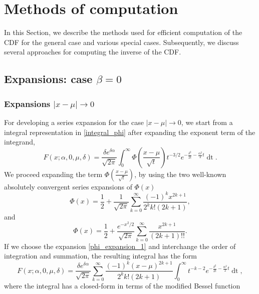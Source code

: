 \documentclass[10pt,a4paper,oneside]{article}
\numberwithin{equation}{section}
\begin{document}
\section{Methods of computation}
In this Section, we describe the methods used for efficient computation of the CDF for the general case and various special cases. Subsequently, we discuss several approaches for computing the inverse of the CDF.
\subsection{Expansions: case $\beta = 0$}

\subsubsection{Expansions $|x-\mu| \to 0$}
For developing a series expansion for the case $|x-\mu| \to 0$, we start from a integral representation in \eqref{integral_phi} after expanding the exponent term of the integrand,
\begin{equation}\label{integral_phi2}
F(x; \alpha, 0, \mu, \delta) = \frac{\delta e^{\delta \alpha}}{\sqrt{2\pi}} \int_0^{\infty} \Phi\left(\frac{x - \mu}{\sqrt{t}}\right) t^{-3/2} e^{-\frac{\delta^2}{2t} - \frac{\alpha^2}{2}t} \mathop{dt}.
\end{equation}
We proceed expanding the term $\Phi\left(\frac{x-\mu}{\sqrt{t}}\right)$, by using the two well-known absolutely convergent series expansions of $\Phi(x)$ \cite[\S 2]{Lebedev1972}
\begin{equation}\label{phi_expansion_1}
\Phi(x) = \frac{1}{2} + \frac{1}{\sqrt{2\pi}}\sum_{k=0}^{\infty} \frac{(-1)^k x^{2k + 1}}{2^k k! (2k+1)},
\end{equation}
and
\begin{equation}\label{phi_expansion_2}
\Phi(x) = \frac{1}{2} + \frac{e^{-x^2 / 2}}{\sqrt{2\pi}}\sum_{k=0}^{\infty} \frac{x^{2k+1}}{(2k + 1)!!}.
\end{equation}
If we choose the expansion \eqref{phi_expansion_1} and interchange the order of integration and summation, the resulting integral has the form
\begin{equation}\label{phi_expansion_integral_xmu_b0_alternating}
F(x; \alpha, 0, \mu, \delta) = \frac{\delta e^{\delta \alpha}}{\sqrt{2\pi}} \sum_{k=0}^{\infty} \frac{(-1)^k (x-\mu)^{2k + 1}}{2^k k! (2k + 1)}\int_0^{\infty} t^{-k-2} e^{-\frac{\delta^2}{2t} - \frac{\alpha^2}{2}t} \mathop{dt},
\end{equation}
where the integral has a closed-form in terms of the modified Bessel function
\end{document}
